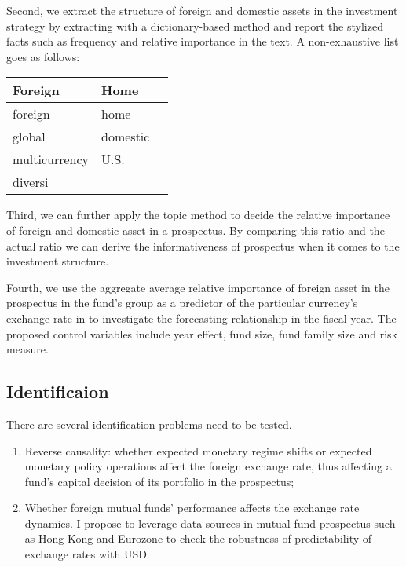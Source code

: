 \documentclass[12pt]{article} %
\begin{document}
	Second, we extract the structure of foreign and domestic assets in the investment strategy by extracting with a dictionary-based method and report the stylized facts such as frequency and relative importance in the text. A non-exhaustive list goes as follows:\par
\begin{table}[h]
\begin{tabular}{@{}lll@{}}
\toprule
\textbf{Foreign} & \textbf{Home} &  \\ \midrule
foreign          & home          &  \\
global           & domestic      &  \\
multicurrency    & U.S.          &  \\
diversi          &               &  \\ \bottomrule
\end{tabular}
\end{table}
	Third, we can further apply the topic method to decide the relative importance of foreign and domestic asset in a prospectus. By comparing this ratio and the actual ratio we can derive the informativeness of prospectus when it comes to the investment structure. \par
	Fourth, we use the aggregate average relative importance of foreign asset in the prospectus in the fund's group as a predictor of the particular currency's exchange rate in to investigate the forecasting relationship in the fiscal year. The proposed control variables include year effect, fund size, fund family size and risk measure.\par
	\subsection{Identificaion}
	There are several identification problems need to be tested. 
	\begin{enumerate}
		\item Reverse causality: whether expected monetary regime shifts or expected monetary policy operations affect the foreign exchange rate, thus affecting a fund's capital decision of its portfolio in the prospectus;
		\item Whether foreign mutual funds' performance affects the exchange rate dynamics. I propose to leverage data sources in mutual fund prospectus such as Hong Kong and Eurozone to check the robustness of predictability of exchange rates with USD.
	\end{enumerate}
\end{document}
